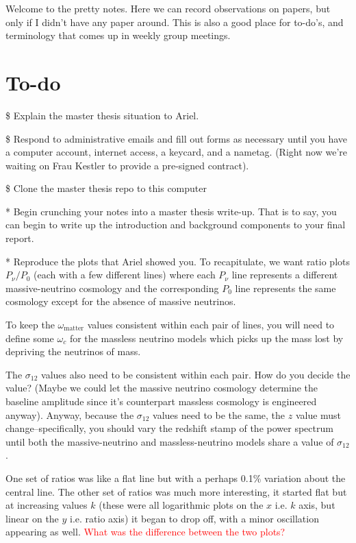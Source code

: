 \documentclass[11pt]{article}
\begin{document}
\fontsize{12}{15}

Welcome to the pretty notes. Here we can record observations on papers, but
only if I didn't have any paper around. This is also a good place for to-do's,
and terminology that comes up in weekly group meetings.

\section{To-do}

\$ Explain the master thesis situation to Ariel.

\$ Respond to administrative emails and fill out forms as necessary until you
have a computer account, internet access, a keycard, and a nametag. (Right now
we're waiting on Frau Kestler to provide a pre-signed contract).

\$ Clone the master thesis repo to this computer

* Begin crunching your notes
into a master thesis write-up. That is to say, you can begin to write up the
introduction and background components to your final report.

* Reproduce the plots that Ariel showed you. To recapitulate, we want ratio
plots $P_\nu / P_0$ (each with a few different lines) where each $P_\nu$ line
represents a different massive-neutrino cosmology and the corresponding $P_0$
line represents the same cosmology except for the absence of massive neutrinos.

To keep the $\omega_\text{matter}$ values consistent within each pair of lines,
you will need to define some $\omega_c$ for the massless neutrino models which
picks up the mass lost by depriving the neutrinos of mass.

The $\sigma_{12}$ values also need to be consistent within each pair. How do
you decide the value? (Maybe we could let the massive neutrino cosmology
determine the baseline amplitude since it's counterpart massless cosmology is
engineered anyway). Anyway, because the $\sigma_{12}$ values need to be the
same, the $z$ value must change--specifically, you should vary the redshift
stamp of the power spectrum until both the massive-neutrino and
massless-neutrino models share a value of $\sigma_{12}$.

One set of ratios was like a flat line but with a perhaps 0.1\% variation about
the central line. The other set of ratios was much more interesting, it started
flat but at increasing values $k$ (these were all logarithmic plots on the $x$
i.e. $k$ axis, but linear on the $y$ i.e. ratio axis) it began to drop off,
with a minor oscillation appearing as well. \textcolor{red}{What was the
difference between the two plots?}
\end{document}
